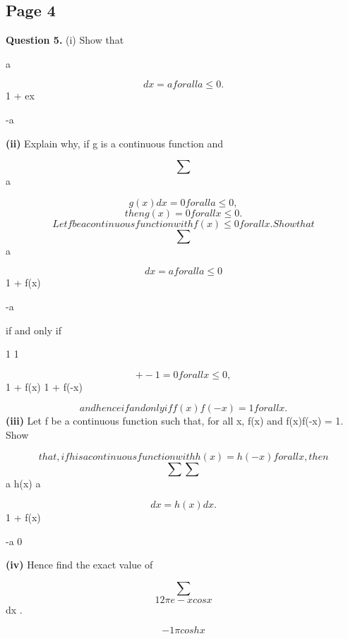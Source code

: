 \documentclass[12pt]{article}
\begin{document}
\subsection*{Page 4}
\begin{flushleft}
\bigskip\textbf{Question 5.} (i) Show that \sum\par
a\par
\[dx = a for all a \leq 0.\]
1 + ex\par
-a\par
\textbf{(ii)} Explain why, if g is a continuous function and\par
\[\sum\]
a\par
\[g(x) dx = 0 for all a \leq 0,\]
\[then g(x) = 0 for all x \leq 0.\]
\[Let f be a continuous function with f(x) \leq 0 for all x. Show that\]
\[\sum\]
a\par
\[dx = a for all a \leq 0\]
1 + f(x)\par
-a\par
if and only if\par
1 1\par
\[+ - 1 = 0 for all x \leq 0,\]
1 + f(x) 1 + f(-x)\par
\[and hence if and only if f(x)f(-x) = 1 for all x.\]
\textbf{(iii)} Let f be a continuous function such that, for all x, f(x)  and f(x)f(-x) = 1. Show\par
\[that, if h is a continuous function with h(x) = h(-x) for all x, then\]
\[\sum \sum\]
a h(x) a\par
\[dx = h(x) dx .\]
1 + f(x)\par
-a 0\par
\textbf{(iv)} Hence find the exact value of\par
\[\sum\]
\[1 2 \pi e -x cos x\]
dx .\par
\[- 1 \pi cosh x\]
\end{flushleft}
\end{document}
